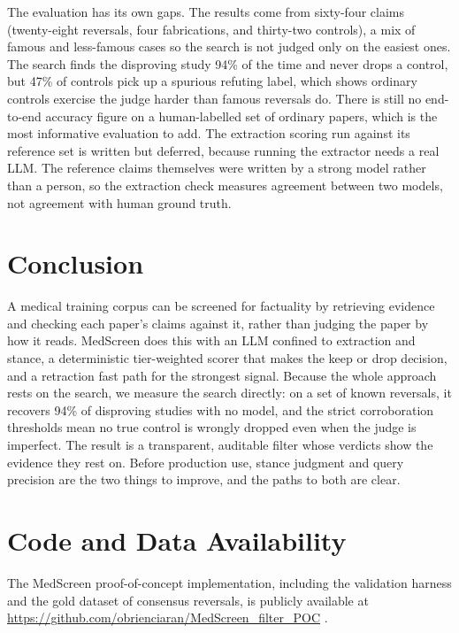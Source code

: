 \documentclass[11pt,a4paper]{article}
\begin{document}
The evaluation has its own gaps. The results come from sixty-four claims (twenty-eight reversals, four fabrications, and thirty-two controls), a mix of famous and less-famous cases so the search is not judged only on the easiest ones. The search finds the disproving study 94\% of the time and never drops a control, but 47\% of controls pick up a spurious refuting label, which shows ordinary controls exercise the judge harder than famous reversals do. There is still no end-to-end accuracy figure on a human-labelled set of ordinary papers, which is the most informative evaluation to add. The extraction scoring run against its reference set is written but deferred, because running the extractor needs a real LLM. The reference claims themselves were written by a strong model rather than a person, so the extraction check measures agreement between two models, not agreement with human ground truth.

\section{Conclusion}

A medical training corpus can be screened for factuality by retrieving evidence and checking each paper's claims against it, rather than judging the paper by how it reads. MedScreen does this with an LLM confined to extraction and stance, a deterministic tier-weighted scorer that makes the keep or drop decision, and a retraction fast path for the strongest signal. Because the whole approach rests on the search, we measure the search directly: on a set of known reversals, it recovers 94\% of disproving studies with no model, and the strict corroboration thresholds mean no true control is wrongly dropped even when the judge is imperfect. The result is a transparent, auditable filter whose verdicts show the evidence they rest on. Before production use, stance judgment and query precision are the two things to improve, and the paths to both are clear.

\section*{Code and Data Availability}

The MedScreen proof-of-concept implementation, including the validation harness and the gold dataset of consensus reversals, is publicly available at \url{https://github.com/obrienciaran/MedScreen_filter_POC} \citep{medscreen}.



\end{document}
